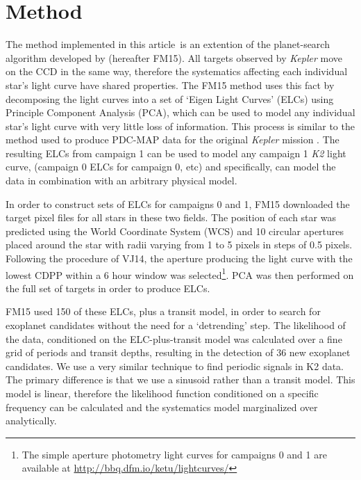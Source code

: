 \documentclass[useAMS, usenatbib, preprint, 12pt]{aastex}
\newcommand{\article}{article}
\begin{document}
\section{Method}
\label{sec:Method}

The method implemented in this \article\ is an extention of the planet-search
algorithm developed by \citet{Foreman-Mackey2015} (hereafter FM15).
All targets observed by {\it Kepler} move on the CCD in the same way,
therefore the systematics affecting each individual star's light curve have
shared properties.
The FM15 method uses this fact by decomposing the light curves into a set
of `Eigen Light Curves' (ELCs) using Principle Component Analysis (PCA), which
can be used to model any individual star's light curve with very little loss
of information.
This process is similar to the method used to produce PDC-MAP data for the
original {\it Kepler} mission \citep[][]{Stumpe2012, Smith2012}.
The resulting ELCs from campaign 1 can be used to model any campaign 1 {\it
K2} light curve, (campaign 0 ELCs for campaign 0, etc) and specifically, can
model the data in combination with an arbitrary physical model.

In order to construct sets of ELCs for campaigns 0 and 1, FM15 downloaded the
target pixel files for all stars in these two fields.
The position of each star was predicted using the World Coordinate System (WCS)
and 10 circular apertures placed around the star with radii varying from 1 to
5 pixels in steps of 0.5 pixels.
Following the procedure of VJ14, the aperture producing the
light curve with the lowest CDPP within a 6 hour window
\citep{Christiansen2012} was selected\footnote{The simple aperture photometry
light curves for campaigns 0 and 1 are available at
\url{http://bbq.dfm.io/ketu/lightcurves/}}.
PCA was then performed on the full set of targets in order to produce ELCs.

FM15 used 150 of these ELCs, plus a transit model, in order to
search for exoplanet candidates without the need for a `detrending' step.
The likelihood of the data, conditioned on the ELC-plus-transit
model was calculated over a fine grid of periods and transit depths, resulting
in the detection of 36 new exoplanet candidates.
We use a very similar technique to find periodic signals in K2 data.
The primary difference is that we use a sinusoid rather than a transit model.
This model is linear, therefore the likelihood function conditioned on
a specific frequency can be calculated and the systematics model marginalized
over analytically.
\end{document}
